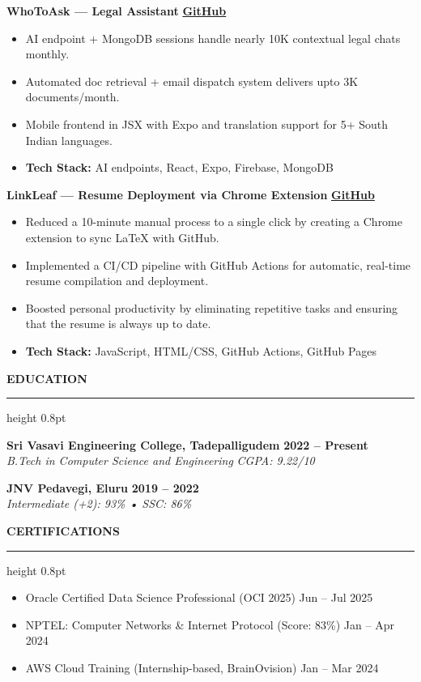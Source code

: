 \documentclass[10pt,a4paper]{article}
\newcommand{\resumesection}[1]{
    \vspace{6pt}
    {\color{primary} \large \textbf{\MakeUppercase{#1}}}
    \vspace{6pt}
    \hrule height 0.8pt
    \vspace{4pt}
}
\newcommand{\educationentry}[4]{
    \noindent\textbf{#1} \hfill \textbf{#2} \\
    \noindent\textit{#3} \hfill \textit{#4}
    \vspace{4pt}
}
\newcommand{\techstack}[1]{
    \noindent\textbf{Tech Stack:} #1
}
\newcommand{\entry}[3]{
    \noindent\textbf{#1} \hfill #2%
    \if\relax\detokenize{#3}\relax%
    \else\\\noindent\textit{#3}%
    \fi
}
\begin{document}
\vspace{6pt}

\entry
  {WhoToAsk — Legal Assistant}
  {\href{https://github.com/AbhiAnantapalli215/WhoToAsk}
  {\textbf{GitHub}}}
  {}
\begin{itemize}
    \item AI endpoint + MongoDB sessions handle nearly 10K contextual legal chats monthly.
    \item Automated doc retrieval + email dispatch system delivers upto 3K documents/month.
    \item Mobile frontend in JSX with Expo and translation support for 5+ South Indian languages.
    \item \techstack{AI endpoints, React, Expo, Firebase, MongoDB}
\end{itemize}


\vspace{6pt}

\entry
  {LinkLeaf — Resume Deployment via Chrome Extension}
  {\href{https://github.com/AbhiAnantapalli215/Resume}{\textbf{GitHub}}}
  {}
\begin{itemize}
    \item Reduced a 10-minute manual process to a single click by creating a Chrome extension to sync LaTeX with GitHub.
    \item Implemented a CI/CD pipeline with GitHub Actions for automatic, real-time resume compilation and deployment.
    \item Boosted personal productivity by eliminating repetitive tasks and ensuring that the resume is always up to date.
    \item \techstack{JavaScript, HTML/CSS, GitHub Actions, GitHub Pages}
\end{itemize}


\resumesection{Education}
\educationentry{Sri Vasavi Engineering College, Tadepalligudem}{2022 -- Present}
    {B.Tech in Computer Science and Engineering}{CGPA: 9.22/10}
    
\educationentry{JNV Pedavegi, Eluru}{2019 -- 2022}
    {Intermediate (+2): 93\% • SSC: 86\%}{}

\resumesection{Certifications}
\begin{itemize}
    \item Oracle Certified Data Science Professional (OCI 2025) \hfill Jun -- Jul 2025
    \item NPTEL: Computer Networks \& Internet Protocol (Score: 83\%) \hfill Jan -- Apr 2024
    \item AWS Cloud Training (Internship-based, BrainOvision) \hfill Jan -- Mar 2024
\end{itemize}
\end{document}
